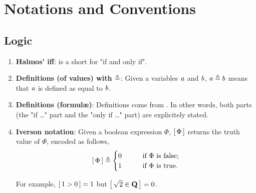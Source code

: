 \renewcommand{\labelenumi}{\arabic{enumi}.}
\chapter{Notations and Conventions}
\section{Logic}
\begin{enumerate}
\item{{\bf Halmos' iff}:  \iif is a short for "if and only if".}
\item{{\bf Definitions (of values) with $\triangleq$}: Given a variables %
$\mathit{a}$ and $\mathit{b}$, %
$a\triangleq b$ means that $\mathit{a}$ is defined as equal to $\mathit{b}$.}
\item{{\bf Definitions (formul\ae)}: Definitions come from \iif. %
In other words, both parts (the "if \dots" part and the "only if \dots" part) %
are explicitely stated. }
\item{{\bf Iverson notation}:  Given a boolean expression $\Phi$, %
$\left[\,\Phi\,\right]$ returns the truth value of $\Phi$, encoded as follows, %
%
  \begin{align} \nonumber
    \left[\,\Phi\,\right]\triangleq 
    \begin{cases}
      0 & \quad\quad \text{if } \Phi \text{ is false;} \\
      1 & \quad\quad \text{if } \Phi \text{ is true.}
    \end{cases}
  \end{align}

For example, $\left[\,1 > 0\,\right] = 1$ but $\left[\, \sqrt{2} \in {\mathbf Q}\,\right] = 0$.
}
\end{enumerate}
